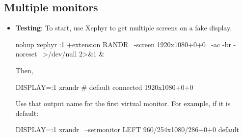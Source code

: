 \documentclass{report}
\begin{document}
    \pagebreak 
    \subsection{Multiple monitors}
    \begin{itemize}
        \item \textbf{Testing}: To start, use Xephyr to get multiple screens on a fake display.        
            \bigbreak \noindent 
            \begin{bashcode}
            nohup xephyr :1 +extension RANDR \
                -screen 1920x1080+0+0 \
                -ac -br -noreset \
                >/dev/null 2>&1 &
            \end{bashcode}
            \bigbreak \noindent 
            Then,
            \bigbreak \noindent 
            \begin{bashcode}
            DISPLAY=:1 xrandr # default connected 1920x1080+0+0
            \end{bashcode}
            \bigbreak \noindent 
            Use that output name for the first virtual monitor. For example, if it is default:
            \bigbreak \noindent 
            \begin{bashcode}
                DISPLAY=:1 xrandr \
                    --setmonitor LEFT 960/254x1080/286+0+0 default


\end{bashcode}
\end{itemize}
\end{document}
